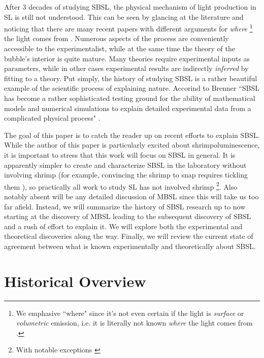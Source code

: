 \documentclass[rmp,aps,nofootinbib,superscriptaddress,floatfix,10pt]{revtex4-2}
\begin{document}
After 3 decades of studying SBSL, the physical mechanism of light production in SL is still not understood. This can be seen by glancing at the literature and noticing that there are many recent papers with different arguments for \emph{where} \footnote{We emphasive ``where" since it's not even certain if the light is \emph{surface} or \emph{volumetric} emission, i.e. it is literally not known \emph{where} the light comes from \cite{}.} the light comes from \cite{borisenok2020mechanisms,flannigan2013non,flannigan2012temperature,tatartchenko2017sonoluminescence}. Numerous aspects of the process are conveniently accessible to the experimentalist, while at the same time the theory of the bubble's interior is quite mature. Many theories require experimental inputs as parameters, while in other cases experimental results are indirectly \emph{inferred} by fitting to a theory. Put simply, the history of studying SBSL is a rather beautiful example of the scientific process of explaining nature. Accorind to Brenner ``SBSL has become a rather sophisticated testing ground for the ability of mathematical models and numerical simulations to explain detailed experimental data from a complicated physical process" \cite{brenner2002single}.


The goal of this paper is to catch the reader up on recent efforts to explain SBSL. While the author of this paper is particularly excited about shrimpoluminescence, it is important to stress that this work will focus on SBSL in general. It is apparently simpler to create and characterize SBSL in the laboratory without involving shrimp (for example, convincing the shrimp to snap requires tickling them \cite{lohse2001snapping,versluis2000snapping,lohse2018bubble}), so practically all work to study SL has not involved shrimp \footnote{ With notable exceptions \cite{tang2019bioinspired}}. Also notably absent will be any detailed discussion of MBSL since this will take us too far afield. Instead, we will summarize the history of SBSL research up to now starting at the discovery of MBSL leading to the subsequent discovery of SBSL and a rush of effort to explain it. We will explore both the experimental and theoretical discoveries along the way. Finally, we will review the current state of agreement between what is known experimentally and theoretically about SBSL. 

\section{Historical Overview}
\end{document}
